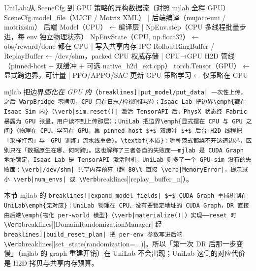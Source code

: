 \begin{codebox}[text]{UniLab:从 SceneCfg 到 GPU 策略的异构数据流（对照 mjlab 全程 GPU）}
SceneCfg.model_file（MJCF / Motrix XML）
  | 后端编译（mujoco-uni / motrixsim）
后端 Model（CPU）              ← 编译层
  | NpEnv.step（CPU 多线程批量步进，每 env 独立物理状态）
NpEnvState（CPU, np.float32）   ← obs/reward/done 都在 CPU
  | 写入共享内存 IPC
RolloutRingBuffer / ReplayBuffer  ← /dev/shm，packed CPU 权威存储
  | CPU→GPU H2D 管线（pinned-host + 双缓冲 + 可选 native_h2d_ext.cpp）
torch.Tensor（GPU）             ← 显式跨边界，可计量
  | PPO/APPO/SAC 更新
GPU 策略学习                   ← 仅策略在 GPU
\end{codebox}

\begin{insight}\label{ins:rlmc-phys-boundary}
mjlab 把边界\emph{固化在 GPU 内}（\Verb[breaklines]|put_model/put_data| 一次性上传，之后 WarpBridge 零拷贝，CPU 只在日志/检视时越界）；Isaac Lab 把边界\emph{藏在 Isaac Sim 内}（\verb|sim.reset()| 激活 TensorAPI 后，PhysX 状态经 Fabric 暴露为 GPU 张量，用户读不到上传那层）；UniLab 把边界\emph{显式摆在 CPU 与 GPU 之间}（物理在 CPU、学习在 GPU，靠 pinned-host $+$ 双缓冲 $+$ 后台 H2D 线程把「采样打包」与「GPU 训练」流水线重叠）。\textbf{本质}：哪种范式都绕不开这道边界，区别只在「数据原生在哪、何时跨」。这也解释了三者各自的失败面——mjlab 是 CUDA Graph 地址锁定，Isaac Lab 是 TensorAPI 激活时机，UniLab 则多了一个 GPU-sim 没有的失败面：\verb|/dev/shm| 共享内存预算（超 80\% 直接 \verb|MemoryError|，提示减小 \verb|num_envs| 或 \Verb[breaklines]|replay_buffer_n|）。
\end{insight}

\begin{note}
本节 mjlab 的 \Verb[breaklines]|expand_model_fields| $+$ CUDA Graph 重捕机制在 UniLab\emph{无对应}：UniLab 物理在 CPU、没有要锁定地址的 CUDA Graph，DR 直接由后端\emph{物化 per-world 模型}（\verb|materialize()|）实现——reset 时 \Verb[breaklines]|DomainRandomizationManager| 经 \Verb[breaklines]|build_reset_plan| 把 per-env 参数写进后端 \Verb[breaklines]|set_state(randomization=...)|。所以「第一次 DR 后那一步变慢」（mjlab 的 graph 重建开销）在 UniLab 不会出现；UniLab 这侧的对应代价是 H2D 拷贝与共享内存预算。
\end{note}

